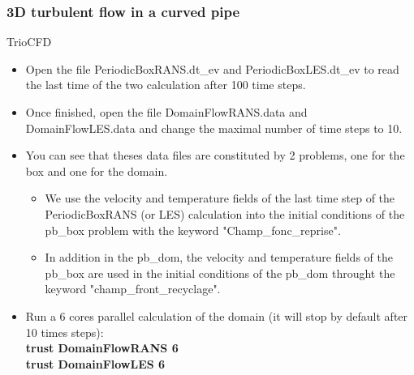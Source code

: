 \documentclass[10pt, hyperref={unicode=true,pdfusetitle, bookmarks=true,bookmarksnumbered=false,bookmarksopen=false, breaklinks=false,pdfborder={0 0 1},backref=true,colorlinks=true,linkcolor=darkblue,pageanchor}]{beamer}
\begin{document}
\begin{frame}
\frametitle{3D turbulent flow in a curved pipe}
\begin{block}{TrioCFD}

\begin{itemize}
\item Open the file PeriodicBoxRANS.dt\_ev and PeriodicBoxLES.dt\_ev to read the last time of the two calculation after 100 time steps.

\item Once finished, open the file DomainFlowRANS.data and DomainFlowLES.data and change the maximal number of time steps to 10.

\item You can see that theses data files are constituted by 2 problems, one for the box and one for the domain.
    \begin {itemize}
    \item We use the velocity and temperature fields of the last time step of the PeriodicBoxRANS (or LES) calculation into the initial conditions of the pb\_box problem with the keyword "Champ\_fonc\_reprise".
    \item In addition in the pb\_dom, the velocity and temperature fields of the pb\_box are used in the initial conditions of the pb\_dom throught the keyword "champ\_front\_recyclage".
    \end{itemize}

\item Run a 6 cores parallel calculation of the domain (it will stop by default after 10 times steps):\\
\textbf{trust DomainFlowRANS 6}\\
\textbf{trust DomainFlowLES 6}

\end{itemize}

\end{block}
\end{frame}
\end{document}
